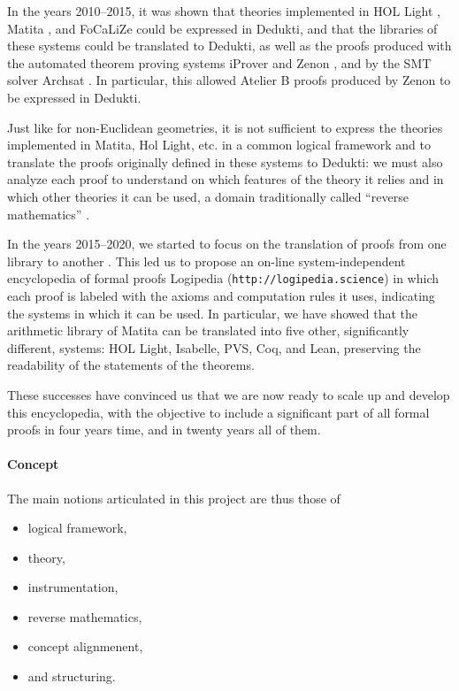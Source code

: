 In the years 2010--2015, it was shown that theories implemented in {\sc
HOL Light} \cite{Assaf12}, {\sc Matita} \cite{Assaf15}, and {\sc
FoCaLiZe} \cite{Cauderlier16} could be expressed in {\sc Dedukti}, and
that the libraries of these systems could be translated to {\sc
Dedukti}, as well as the proofs produced with the automated theorem
proving systems {\sc iProver} \cite{Burel10} and {\sc Zenon}
\cite{CauderlierHalmagrand15}, and by the SMT solver {\sc Archsat}
\cite{Bury19}. In particular, this allowed {\sc Atelier B} proofs
produced by {\sc Zenon} to be expressed in {\sc Dedukti}.

Just like for non-Euclidean geometries, it is not
sufficient to express the theories implemented in {\sc Matita}, {\sc
Hol Light}, etc.  in a common logical framework and to translate the
proofs originally defined in these systems to {\sc Dedukti}: we must
also analyze each proof to understand on which features of the theory
it relies and in which other theories it can be used, a domain traditionally called
``reverse mathematics'' \cite{Friedman76,Simpson09,Dowek17}.


In the years 2015--2020, we started to focus on the translation of
proofs from one library to another \cite{Dowek17,Thire18}. This led us
to propose an on-line system-independent encyclopedia of formal proofs
{\sc Logipedia} ({\tt http://logipedia.science}) in which each proof
is labeled with the axioms and computation rules it uses, indicating
the systems in which it can be used. In particular, we
have showed that the arithmetic library of {\sc Matita} can be
translated into five other, significantly different, systems: {\sc HOL
Light}, {\sc Isabelle}, {\sc PVS}, {\sc Coq}, and {\sc Lean},
preserving the readability of the statements of the theorems.

These successes have convinced us that we are now ready to scale up
and develop this encyclopedia, with the objective to include a
significant part of all formal proofs in four years time, and
in twenty years all of them.

\paragraph{Concept}

The main notions articulated in this project are thus those of
\begin{itemize}
\item logical framework,
\item theory,
\item instrumentation,
\item reverse mathematics,
\item concept alignmenent,
\item and structuring.
\end{itemize}

